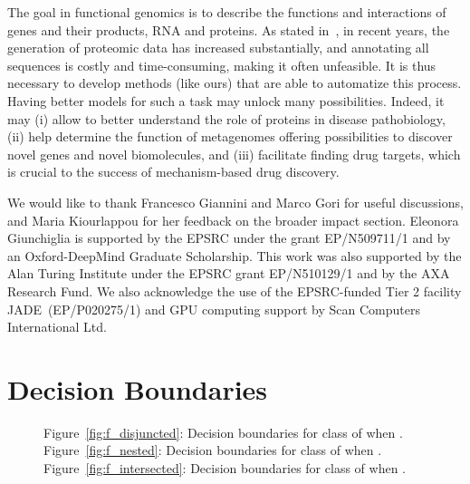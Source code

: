 \documentclass{article}
\begin{document}
The goal in functional genomics is to describe the functions and interactions of genes and their products, RNA and proteins. As stated in~\cite{nakano2019,radivojac2013}, in  recent years, the generation of proteomic data has increased substantially, and annotating all sequences is costly and time-consuming, making it often unfeasible. It is thus necessary to develop methods (like ours) that are able to automatize this process. Having better models for such a task may unlock many possibilities. Indeed, it may 
 (i)  allow to better understand the role of proteins in disease pathobiology,  (ii)   help determine the function of metagenomes offering possibilities to discover novel genes and novel biomolecules, and (iii)   facilitate finding drug targets, which is crucial to the success of mechanism-based drug discovery.











\begin{ack}
We would like to thank Francesco Giannini and Marco Gori for useful discussions, and Maria  Kiourlappou for her feedback on the broader impact section.
Eleonora Giunchiglia is supported by the EPSRC under the grant EP/N509711/1 and by an Oxford-DeepMind Graduate Scholarship.
This work was also supported by the Alan Turing Institute under the EPSRC grant EP/N510129/1 and by the AXA Research Fund. We also acknowledge the use of the EPSRC-funded Tier 2 facility JADE~(EP/P020275/1) and GPU computing support by Scan Computers International Ltd.
\end{ack}






\newpage

\appendix\label{sec:appendix}

\section{Decision Boundaries }\label{app:decbound}

\begin{figure}[h]
    \centering
     \caption{Figure~\ref{fig:f_disjuncted}: Decision boundaries for class  of  when . Figure~\ref{fig:f_nested}: Decision boundaries for class  of  when . Figure~\ref{fig:f_intersected}: Decision boundaries for class  of  when .}
\end{figure}
\end{document}
